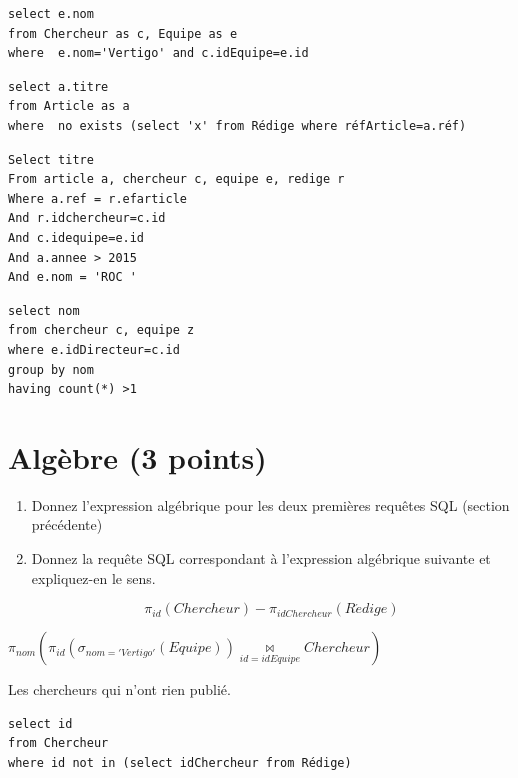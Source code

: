 \begin{solution}
\begin{verbatim}
select e.nom 
from Chercheur as c, Equipe as e
where  e.nom='Vertigo' and c.idEquipe=e.id
\end{verbatim}

\begin{verbatim}
select a.titre 
from Article as a
where  no exists (select 'x' from Rédige where réfArticle=a.réf)
\end{verbatim}


\begin{verbatim}
Select titre
From article a, chercheur c, equipe e, redige r
Where a.ref = r.efarticle
And r.idchercheur=c.id
And c.idequipe=e.id
And a.annee > 2015
And e.nom = 'ROC '
\end{verbatim}

\begin{verbatim}
select nom
from chercheur c, equipe z
where e.idDirecteur=c.id
group by nom
having count(*) >1
\end{verbatim}

\end{solution}
\section{Algèbre (3 points)}



\begin{enumerate}
   \item Donnez l'expression algébrique pour les deux premières requêtes SQL (section précédente)

   \item Donnez la requête SQL correspondant à l'expression algébrique suivante et expliquez-en le sens.

       $$\pi_{id} (Chercheur) - \pi_{idChercheur} (R\acute{e}dige)$$

\end{enumerate}


\begin{solution}
$\pi_{nom}(\pi_{id} (\sigma_{nom = 'Vertigo'} (Equipe)) \underset{id=idEquipe}{\bowtie} Chercheur )$

Les chercheurs qui n'ont rien publié.


\begin{verbatim}
select id
from Chercheur 
where id not in (select idChercheur from Rédige)
\end{verbatim}


\end{solution}


